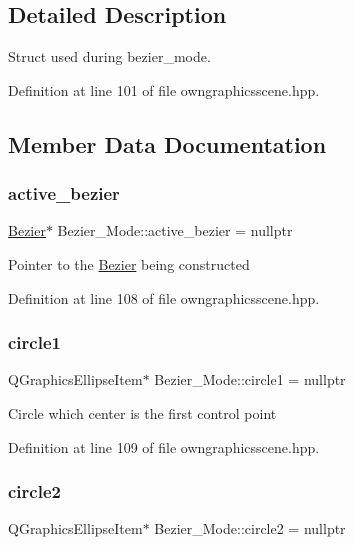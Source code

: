 \subsection{Detailed Description}
Struct used during bezier\+\_\+mode. 

Definition at line 101 of file owngraphicsscene.\+hpp.



\subsection{Member Data Documentation}
\mbox{\label{structBezier__Mode_a9aefbd869ef59854732e405886d334fb}} 
\subsubsection{\texorpdfstring{active\+\_\+bezier}{active\_bezier}}
{\footnotesize\ttfamily \mbox{\hyperlink{classBezier}{Bezier}}$\ast$ Bezier\+\_\+\+Mode\+::active\+\_\+bezier = nullptr}

Pointer to the \mbox{\hyperlink{classBezier}{Bezier}} being constructed 

Definition at line 108 of file owngraphicsscene.\+hpp.

\mbox{\label{structBezier__Mode_ab07833315488dc0d3c6f613c51de1d3f}} 
\subsubsection{\texorpdfstring{circle1}{circle1}}
{\footnotesize\ttfamily Q\+Graphics\+Ellipse\+Item$\ast$ Bezier\+\_\+\+Mode\+::circle1 = nullptr}

Circle which center is the first control point 

Definition at line 109 of file owngraphicsscene.\+hpp.

\mbox{\label{structBezier__Mode_a3f6f2bdade3db15c0855820d86a5b98e}} 
\subsubsection{\texorpdfstring{circle2}{circle2}}
{\footnotesize\ttfamily Q\+Graphics\+Ellipse\+Item$\ast$ Bezier\+\_\+\+Mode\+::circle2 = nullptr}

